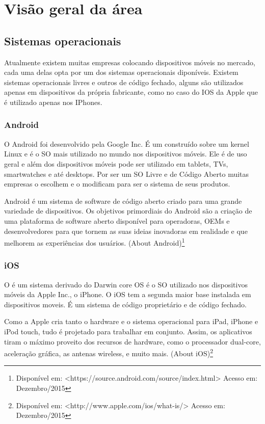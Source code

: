 \chapter{Visão geral da área}
\section{Sistemas operacionais}
Atualmente existem muitas empresas colocando dispositivos móveis no mercado, cada uma delas opta por um dos sistemas operacionais diponíveis.
Existem sistemas operacionais livres e outros de código fechado, alguns são utilizados apenas em dispositivos da própria fabricante, como no caso do IOS da Apple que é utilizado apenas nos IPhones.

\subsection{Android}
O Android foi desenvolvido pela Google Inc. É um  construído sobre um kernel Linux e é o SO mais utilizado no mundo nos dispositivos móveis. Ele é de uso geral e além dos dispositivos móveis pode ser utilizado em tablets, TVs, smartwatches e até desktops. Por ser um SO Livre e de Código Aberto muitas empresas o escolhem e o modificam para ser o sistema de seus produtos.

\begin{citacao}
Android é um sistema de software de código aberto criado para uma grande variedade de dispositivos. Os objetivos primordiais do Android são a criação de uma plataforma de software aberto disponível para operadoras, OEMs e desenvolvedores para que tornem as suas ideias inovadoras em realidade e que melhorem as experiências dos usuários. (About Android)\footnote[1]{Disponível em: <https://source.android.com/source/index.html> Acesso em: Dezembro/2015}
\end{citacao}

\subsection{iOS}
O  é um sistema derivado do Darwin core OS é o SO utilizado nos dispositivos móveis da Apple Inc., o iPhone. O iOS tem a segunda maior base instalada em dispositivos moveis. É um sistema de código proprietário e de código fechado.

\begin{citacao}
Como a Apple cria tanto o hardware e o sistema operacional para iPad, iPhone e iPod touch, tudo é projetado para trabalhar em conjunto. Assim, os aplicativos tiram o máximo proveito dos recursos de hardware, como o processador dual-core, aceleração gráfica, as antenas wireless, e muito mais. (About iOS)\footnote[2]{Disponível em: <http://www.apple.com/ios/what-is/> Acesso em: Dezembro/2015}
\end{citacao}

